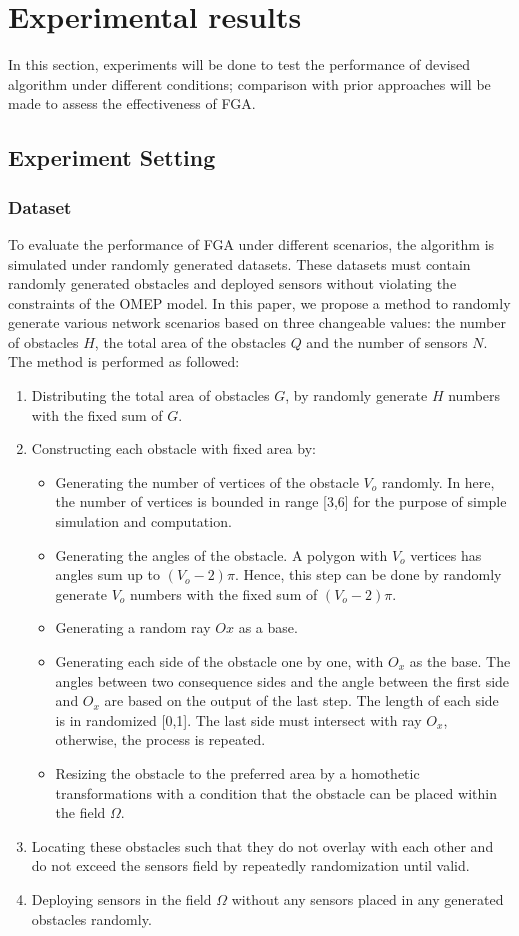 \documentclass[final]{elsarticle}
\begin{document}
\section{Experimental results}
In this section, experiments will be done to test the performance of devised algorithm under different conditions; comparison with prior approaches will be made to assess the effectiveness of FGA. 
\subsection{Experiment Setting}
\subsubsection{Dataset}
To evaluate the performance of FGA under different scenarios, the algorithm is simulated under randomly generated datasets. These datasets must contain randomly generated obstacles and deployed sensors without violating the constraints of the OMEP model. In this paper, we propose a method to randomly generate various network scenarios based on three changeable values: the number of obstacles $H$, the total area of the obstacles $Q$ and the number of sensors $N$. The method is performed as followed: 

\begin{enumerate}
	\item Distributing the total area of obstacles $G$, by randomly generate $H$ numbers with the fixed sum of $G$.
	\item Constructing each obstacle with fixed area by:
	\begin{itemize}
		\item Generating the number of vertices of the obstacle $V_o$ randomly. In here, the number of vertices is bounded in range [3,6] for the purpose of simple simulation and computation. 
		\item Generating the angles of the obstacle. A polygon with $V_o$ vertices has angles sum up to $(V_o - 2)\pi$. Hence, this step can be done by randomly generate $V_o$ numbers with the fixed sum of $(V_o - 2)\pi$.
		\item Generating a random ray $Ox$ as a base.
		\item Generating each side of the obstacle one by one, with $O_x$ as the base. The angles between two consequence sides and the angle between the first side and $O_x$ are based on the output of the last step. The length of each side is in randomized [0,1]. The last side must intersect with ray $O_x$, otherwise, the process is repeated.
		\item Resizing the obstacle to the preferred area by a homothetic transformations with a condition that the obstacle can be placed within the field $\Omega$.
	\end{itemize}
	\item Locating these obstacles such that they do not overlay with each other and do not exceed the sensors field by repeatedly randomization until valid.
	\item Deploying sensors in the field $\Omega$ without any sensors placed in any generated obstacles randomly.
\end{enumerate}
\end{document}

